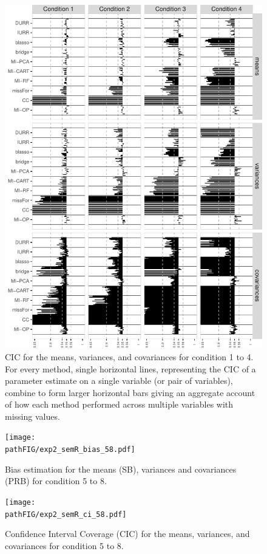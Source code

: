 \documentclass[11pt]{article}
\newcommand{\pathFIG}{../../output/graphs}
\begin{document}
\begin{figure}
	\includegraphics{../../output/graphs/exp2_semR_ci_14.pdf}
\caption{CIC for the means, variances, and covariances for condition 1 to 4.
	For every method, single horizontal lines, representing the CIC of a parameter estimate on 
	a single variable (or pair of variables), combine to form larger horizontal bars giving an 
	aggregate account of how each method performed across multiple variables with missing values.
}
\label{fig:exp2cir14}
\end{figure}


\begin{figure}
	\centering
	\texttt{[image: \\pathFIG/exp2\_semR\_bias\_58.pdf]}
	\caption{Bias estimation for the means (SB), variances and covariances (PRB) for condition 5 
			to 8.}
	\label{fig:exp2bias58}
\end{figure}

\begin{figure}
	\centering
	\texttt{[image: \\pathFIG/exp2\_semR\_ci\_58.pdf]}
	\caption{Confidence Interval Coverage (CIC) for the means, variances, and covariances 
			for condition 5 to 8.}
	\label{fig:exp2cir58}
\end{figure}
\end{document}

